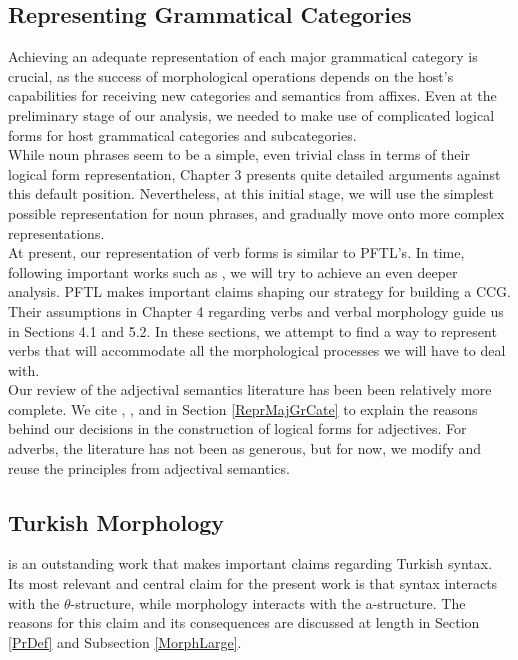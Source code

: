 \documentclass[11pt]{article} %
\begin{document}
\subsection{Representing Grammatical Categories}

Achieving an adequate representation of each major grammatical category is crucial, as the success of morphological operations depends on the host's capabilities for receiving new categories and semantics from affixes. Even at the preliminary stage of our analysis, we needed to make use of complicated logical forms for host grammatical categories and subcategories. \\ 

While noun phrases seem to be a simple, even trivial class in terms of their logical form representation, \citet{Grimshaw1990} Chapter 3 presents quite detailed arguments against this default position. Nevertheless, at this initial stage, we will use the simplest possible representation for noun phrases, and gradually move onto more complex representations. \\

At present, our representation of verb forms is similar to PFTL's. In time, following important works such as \citet{VanValin2006}, we will try to achieve an even deeper analysis. PFTL makes important claims shaping our strategy for building a CCG. Their assumptions in Chapter 4 regarding verbs and verbal morphology guide us in Sections 4.1 and 5.2. In these sections, we attempt to find a way to represent verbs that will accommodate all the morphological processes we will have to deal with. \\

Our review of the adjectival semantics literature has been been relatively more complete. We cite \citet{Paoli1999}, \citet{Paradis2001}, \citet{KennedyMcNally2005} and \citet{Kennedy2007} in Section \ref{ReprMajGrCate} to explain the reasons behind our decisions in the construction of logical forms for adjectives. For adverbs, the literature has not been as generous, but for now, we modify and reuse the principles from adjectival semantics. \\

\subsection{Turkish Morphology}

\citet{Sezer1991} is an outstanding work that makes important claims regarding Turkish syntax. Its most relevant and central claim for the present work is that syntax interacts with the $\theta$-structure, while morphology interacts with the a-structure. The reasons for this claim and its consequences are discussed at length in Section \ref{PrDef} and Subsection \ref{MorphLarge}. \\
\end{document}
